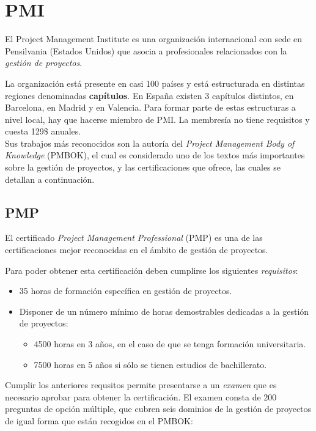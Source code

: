 \section{PMI}

El Project Management Institute es una organización internacional con sede en Pensilvania (Estados Unidos) que asocia a profesionales relacionados con la \emph{gestión de proyectos}.

La organización está presente en casi 100 países y está estructurada en distintas regiones denominadas \textbf{capítulos}. En España existen 3 capítulos distintos, en Barcelona, en Madrid y en Valencia. Para formar parte de estas estructuras a nivel local, hay que hacerse miembro de PMI. La membresía no tiene requisitos y cuesta 129\$ anuales.\\

Sus trabajos más reconocidos son la autoría del \emph{Project Management Body of Knowledge} (PMBOK), el cual es considerado uno de los textos más importantes sobre la gestión de proyectos, y las certificaciones que ofrece, las cuales se detallan a continuación.

\subsection{PMP}

El certificado \emph{Project Management Professional} (PMP) es una de las certificaciones mejor reconocidas en el ámbito de gestión de proyectos.

Para poder obtener esta certificación deben cumplirse los siguientes \emph{requisitos}:

\begin{itemize}
\item 35 horas de formación específica en gestión de proyectos.
\item Disponer de un número mínimo de horas demostrables dedicadas a la gestión de proyectos:
	\begin{itemize}
	\item 4500 horas en 3 años, en el caso de que se tenga formación universitaria.
	\item 7500 horas en 5 años si sólo se tienen estudios de bachillerato.
	\end{itemize} 
\end{itemize}

Cumplir los anteriores requsitos permite presentarse a un \emph{examen} que es necesario aprobar para obtener la certificación. El examen consta de 200 preguntas de opción múltiple, que cubren seis dominios de la gestión de proyectos de igual forma que están recogidos en el PMBOK:

